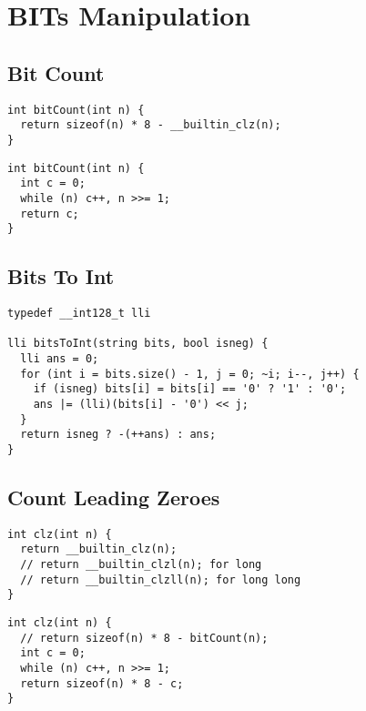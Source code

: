 \documentclass[twoside]{article}
\begin{document}
\begin{multicols*}{2}
\begin{verbatim}
\end{verbatim}

\sectionfont{\bfseries\sffamily\centering\Huge}
\vspace{1em}
\section*{BITs Manipulation}
\vspace{3em}
\subsectionfont{\large\bfseries\sffamily\underline}
\subsection*{Bit Count}
\begin{verbatim}
int bitCount(int n) {
  return sizeof(n) * 8 - __builtin_clz(n);
}
\end{verbatim}
\vspace{-12pt}
\begin{verbatim}
int bitCount(int n) {
  int c = 0;
  while (n) c++, n >>= 1;
  return c;
}
\end{verbatim}

\subsectionfont{\large\bfseries\sffamily\underline}
\subsection*{Bits To Int}
\begin{verbatim}
typedef __int128_t lli

lli bitsToInt(string bits, bool isneg) {
  lli ans = 0;
  for (int i = bits.size() - 1, j = 0; ~i; i--, j++) {
    if (isneg) bits[i] = bits[i] == '0' ? '1' : '0';
    ans |= (lli)(bits[i] - '0') << j;
  }
  return isneg ? -(++ans) : ans;
}
\end{verbatim}

\subsectionfont{\large\bfseries\sffamily\underline}
\subsection*{Count Leading Zeroes}
\begin{verbatim}
int clz(int n) {
  return __builtin_clz(n);
  // return __builtin_clzl(n); for long
  // return __builtin_clzll(n); for long long
}
\end{verbatim}
\vspace{-12pt}
\begin{verbatim}
int clz(int n) {
  // return sizeof(n) * 8 - bitCount(n);
  int c = 0;
  while (n) c++, n >>= 1;
  return sizeof(n) * 8 - c;
}
\end{verbatim}


\end{multicols*}
\end{document}
